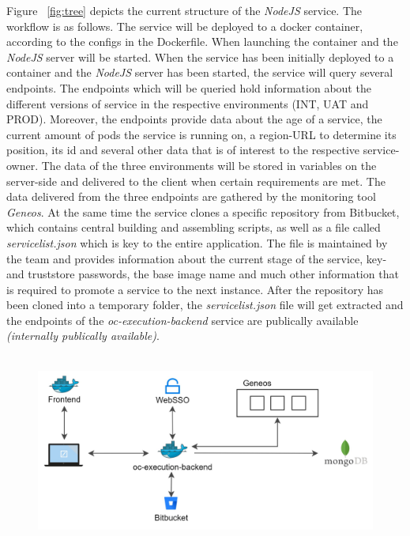 \documentclass[a4paper,11pt, pagesize]{scrartcl}
\begin{document}
\begin{spacing}{1.2}
Figure ~\ref{fig:tree} depicts the current structure of the \textit{NodeJS} service. The workflow is as follows. The service will be deployed to a docker container, according to the configs in the Dockerfile. When launching the container and the \textit{NodeJS} server will be started. When the service has been initially deployed to a container and the \textit{NodeJS} server has been started, the service will query several endpoints. The endpoints which will be queried hold information about the different versions of service in the respective environments (INT, UAT and PROD). Moreover, the endpoints provide data about the age of a service, the current amount of pods the service is running on, a region-URL to determine its position, its id and several other data that is of interest to the respective service-owner. The data of the three environments will be stored in variables on the server-side and delivered to the client when certain requirements are met. The data delivered from the three endpoints are gathered by the monitoring tool \textit{Geneos}. At the same time the service clones a specific repository from Bitbucket, which contains central building and assembling scripts, as well as a file called \textit{servicelist.json} which is key to the entire application. The file is maintained by the team and provides information about the current stage of the service, key- and truststore passwords, the base image name and much other information that is required to promote a service to the next instance. After the repository has been cloned into a temporary folder, the \textit{servicelist.json} file will get extracted and the endpoints of the \textit{oc-execution-backend} service are publically available \textit{(internally publically available)}.\\\\ 
\begin{figure}[H]
\label{fig:oc}
\centering
\includegraphics[width=1\textwidth]{oc.jpg}

\end{figure}
\end{spacing}
\end{document}
